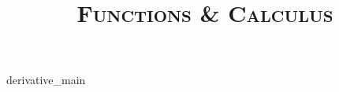 \documentclass{article}
\title{\textsc{Functions \& Calculus}}
\begin{document}
\maketitle
\tableofcontents

\pagebreak

{derivative_main}
\end{document}
